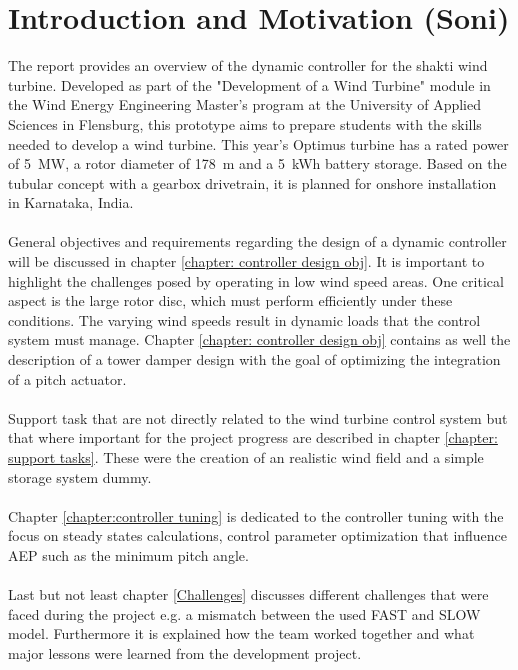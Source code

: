 \chapter{Introduction and Motivation (Soni)}

The report provides an overview of the dynamic controller for the \gls{shakti} wind turbine. Developed as part of the "Development of a Wind Turbine" module in the Wind Energy Engineering Master’s program at the University of Applied Sciences in Flensburg, this prototype aims to prepare students with the skills needed to develop a wind turbine. This year’s Optimus turbine has a rated power of \SI{5}{MW}, a rotor diameter of \SI{178}{m} and a \SI{5}{kWh} battery storage. Based on the tubular concept with a gearbox drivetrain, it is planned for onshore installation in Karnataka, India.
\\
\\
General objectives and requirements regarding the design of a dynamic controller will be discussed in chapter \ref{chapter: controller design obj}. 
It is important to highlight the challenges posed by operating in low wind speed areas.
One critical aspect is the large rotor disc, which must perform efficiently under these conditions.
The varying wind speeds result in dynamic loads that the control system must manage.
Chapter \ref{chapter: controller design obj} contains as well the description of a tower damper design with the goal of optimizing the integration of a pitch actuator.
\\
\\
Support task that are not directly related to the wind turbine control system but that where important for the project progress are described in chapter \ref{chapter: support tasks}. 
These were the creation of an realistic wind field and a simple storage system dummy.
\\
\\
Chapter \ref{chapter:controller tuning} is dedicated to the controller tuning with the focus on steady states calculations, control parameter optimization that influence \gls{AEP} such as the minimum pitch angle.
\\
\\
Last but not least chapter \ref{Challenges} discusses different challenges that were faced during the project e.g. a mismatch between the used \gls{FAST} and \gls{SLOW} model. Furthermore it is explained how the team worked together and what major lessons were learned from the development project.
